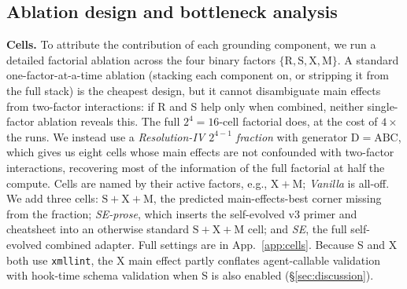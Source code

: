 \documentclass{article}
\begin{document}





\subsection{Ablation design and bottleneck analysis}
\label{subsec:cells}

\textbf{Cells.} To attribute the contribution of each grounding component, we run a detailed factorial ablation across the four binary factors $\{\mathrm{R, S, X, M}\}$. A standard one-factor-at-a-time ablation (stacking each component on, or stripping it from the full stack) is the cheapest design, but it cannot disambiguate main effects from two-factor interactions: if R and S help only when combined, neither single-factor ablation reveals this. The full $2^4 = 16$-cell factorial does, at the cost of $4{\times}$ the runs. We instead use a \emph{Resolution-IV $2^{4-1}$ fraction} with generator $\mathrm{D}{=}\mathrm{ABC}$, which gives us eight cells whose main effects are not confounded with two-factor interactions, recovering most of the information of the full factorial at half the compute. Cells are named by their active factors, e.g., $\mathrm{X+M}$; \emph{Vanilla} is all-off. We add three cells: $\mathrm{S+X+M}$, the predicted main-effects-best corner missing from the fraction; \emph{SE-prose}, which inserts the self-evolved v3 primer and cheatsheet into an otherwise standard $\mathrm{S+X+M}$ cell; and \emph{SE}, the full self-evolved combined adapter. Full settings are in App.~\ref{app:cells}. Because S and X both use \texttt{xmllint}, the X main effect partly conflates agent-callable validation with hook-time schema validation when S is also enabled (\S\ref{sec:discussion}).
\end{document}
